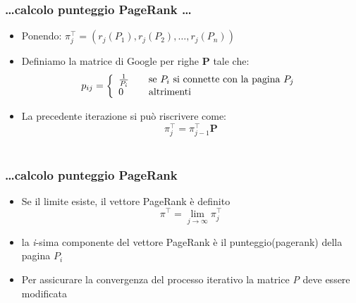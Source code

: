 \documentclass{beamer}
\begin{document}
\begin{frame}
	\frametitle{\dots calcolo punteggio PageRank \dots}
	\begin{itemize}
		\item Ponendo: $\pi_j^\intercal = (r_j(P_1),r_j(P_2),\dots,r_j(P_n))$\\
		\item Definiamo la matrice di Google per righe \textbf{P} tale che:
		\[ p_{ij} = \left\{ 
		\begin{array}{l l}
		\frac{1}{P_i} & \quad \text{se $P_i$ si connette con la pagina $P_j$}\\
		0 & \quad \text{altrimenti}
		\end{array} \right.\]
		\item La precedente iterazione si può riscrivere come: $$ \pi_j^\intercal = \pi_{j-1}^\intercal \textbf{P}$$\\
	\end{itemize}
\end{frame}



\begin{frame}
	\frametitle{\dots calcolo punteggio PageRank}
	\begin{itemize}
		\item Se il limite esiste, il vettore PageRank è definito $$ \pi^\intercal = \lim_{j\to\infty}\pi_j^\intercal$$
		\item la \emph{i}-sima componente del vettore PageRank è il punteggio(pagerank) della pagina $P_i$
		\item Per assicurare la convergenza del processo iterativo la matrice \emph{P} deve essere modificata
	\end{itemize}
\end{frame}

\end{document}

